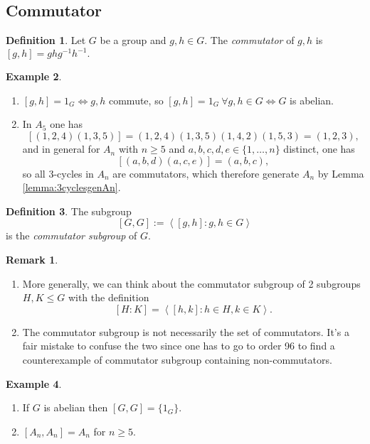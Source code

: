 \documentclass[a4paper]{article}
\newcommand{\la}{\left\langle}
\newcommand{\ra}{\right\rangle}
\theoremstyle{definition}
\newtheorem{defn}{Definition}[subsection]
\newtheorem{example}[defn]{Example}
\newtheorem*{remark}{Remark}
\begin{document}
\subsection{Commutator}
\begin{defn}
Let $G$ be a group and $g,h\in G$. The \textit{commutator} of $g,h$ is $[g,h]=ghg^{-1}h^{-1}.$
\end{defn}
\begin{example}
\begin{enumerate}
\item $[g,h]=1_G \Leftrightarrow g,h$ commute, so $[g,h]=1_G \ \forall g,h\in G\Leftrightarrow G$ is abelian.
\item In $A_5$ one has
\[
[(1,2,4)(1,3,5)]=(1,2,4)(1,3,5)(1,4,2)(1,5,3)=(1,2,3),
\]
and in general for $A_n$ with $n\geq 5$ and $a,b,c,d,e\in\{1,\ldots,n\}$ distinct, one has
\[
[(a,b,d)(a,c,e)]=(a,b,c),
\]
so all 3-cycles in $A_n$ are commutators, which therefore generate $A_n$ by Lemma \ref{lemma:3cyclesgenAn}.
\end{enumerate}
\end{example}

\begin{defn}
The subgroup
\[
[G,G]:=\la[g,h]:g,h\in G\ra
\]
is the \textit{commutator subgroup} of $G$.
\end{defn}

\begin{remark}
\begin{enumerate}
\item More generally, we can think about the commutator subgroup of 2 subgroups $H,K\leq G$ with the definition
\[
[H:K]=\la [h,k]:h\in H,k\in K\ra.
\]
\item The commutator subgroup is not necessarily the set of commutators. It's a fair mistake to confuse the two since one has to go to order 96 to find a counterexample of commutator subgroup containing non-commutators.
\end{enumerate}
\end{remark}

\begin{example}
\begin{enumerate}
\item If $G$ is abelian then $[G,G]=\{1_G\}$.
\item $[A_n,A_n]=A_n$ for $n\geq 5$.
\end{enumerate}
\end{example}
\end{document}
